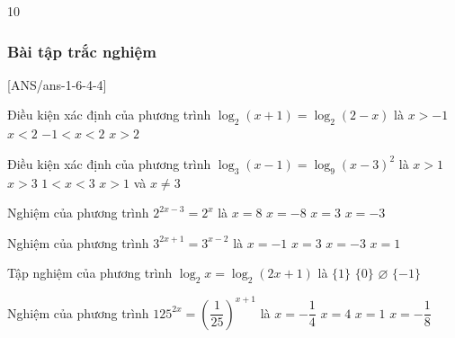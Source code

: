 \begin{indapan}{10}
\subsubsection{Bài tập trắc nghiệm}
[ANS/ans-1-6-4-4]
\begin{ex}
	Điều kiện xác định của phương trình $\log_2(x+1)=\log_2(2-x)$ là
	\choice
	{$x>-1$}
	{$x<2$}
	{\True $-1<x<2$}
	{$x>2$}
\end{ex}

\begin{ex}
	Điều kiện xác định của phương trình $\log_3(x-1)=\log_9(x-3)^2$ là
	\choice
	{$x>1$}
	{$x>3$}
	{$1<x<3$}
	{\True $x>1$ và $x\neq 3$}
\end{ex}


\begin{ex}
	Nghiệm của phương trình $2^{2x-3}=2^x$ là
	\choice
	{$x=8$}
	{$x=-8$}
	{\True $x=3$}
	{$x=-3$}
\end{ex}

\begin{ex}
	Nghiệm của phương trình $3^{2x+1}=3^{x-2}$ là
	\choice
	{$x=-1$}
	{$x=3$}
	{\True $x=-3$}
	{$x=1$}
\end{ex}

\begin{ex}
	Tập nghiệm của phương trình $\log_2x=\log_2(2x+1)$ là
	\choice
	{$\{1\}$}
	{$\{0\}$}
	{\True $\varnothing$}
	{$\{-1\}$}
\end{ex}


\begin{ex}
	Nghiệm của phương trình $125^{2x} = \left(\dfrac{1}{25}\right)^{x+1}$ là
	\choice
	{\True $x = -\dfrac{1}{4}$}
	{$x = 4$}
	{$x = 1$}
	{$x= -\dfrac{1}{8}$}
\end{ex}



\end{indapan}
